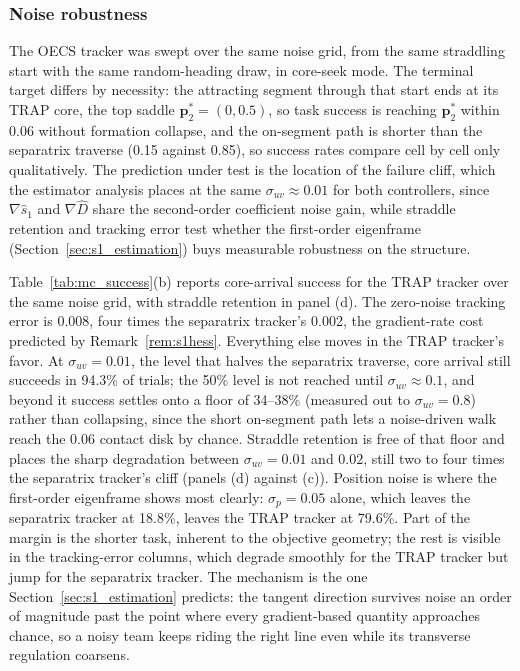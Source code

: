 \documentclass[lettersize,journal]{IEEEtran}
\begin{document}
\subsubsection{Noise robustness}
The OECS tracker was swept over the same noise grid, from the same
straddling start with the same random-heading draw, in core-seek mode.
The terminal target differs by necessity: the attracting segment
through that start ends at its TRAP core, the top saddle
$\mathbf{p}^*_2 = (0, 0.5)$, so task success is reaching
$\mathbf{p}^*_2$ within 0.06 without formation collapse, and the
on-segment path is shorter than the separatrix traverse (0.15 against
0.85), so success rates compare cell by cell only qualitatively. The
prediction under test is the location of the failure cliff, which the
estimator analysis places at the same $\sigma_{uv} \approx 0.01$ for
both controllers, since $\nabla\hat{s}_1$ and $\nabla\hat{D}$ share
the second-order coefficient noise gain, while straddle retention and
tracking error test whether the first-order eigenframe
(Section~\ref{sec:s1_estimation}) buys measurable robustness on the
structure.

Table~\ref{tab:mc_success}(b) reports core-arrival success for the TRAP
tracker over the same noise grid, with straddle retention in panel (d).
The zero-noise tracking error is 0.008, four times the separatrix
tracker's 0.002, the gradient-rate cost predicted by
Remark~\ref{rem:s1hess}. Everything else moves in the TRAP tracker's
favor. At $\sigma_{uv} = 0.01$, the level that halves the separatrix
traverse, core arrival still succeeds in 94.3\% of trials; the 50\%
level is not reached until $\sigma_{uv} \approx 0.1$, and beyond it
success settles onto a floor of 34--38\% (measured out to $\sigma_{uv}
= 0.8$) rather than collapsing, since the short on-segment path lets a
noise-driven walk reach the 0.06 contact disk by chance. Straddle
retention is free of that floor and places the sharp degradation
between $\sigma_{uv} = 0.01$ and $0.02$, still two to four times the
separatrix tracker's cliff (panels (d) against (c)). Position noise is
where the first-order eigenframe shows most clearly: $\sigma_p = 0.05$
alone, which leaves the separatrix tracker at 18.8\%, leaves the TRAP
tracker at 79.6\%. Part of the margin is the shorter task, inherent to
the objective geometry; the rest is visible in the tracking-error
columns, which degrade smoothly for the TRAP tracker but jump for the
separatrix tracker. The
mechanism is the one Section~\ref{sec:s1_estimation} predicts: the
tangent direction survives noise an order of magnitude past the point
where every gradient-based quantity approaches chance, so a noisy team
keeps riding the right line even while its transverse regulation
coarsens.
\end{document}
